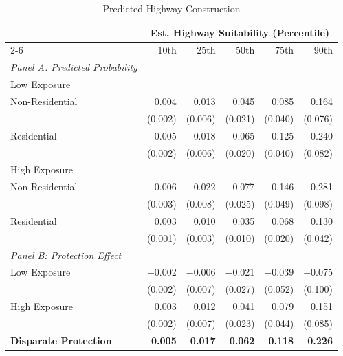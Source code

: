 \begin{table}[h]
\centering
\caption{Predicted Highway Construction }
\label{tab:predicted_outcomes/black_share_sweep}
\begin{threeparttable}
\begin{tabular*}{1\textwidth}{@{\extracolsep{\fill}}lr@{\hspace{1.2em}}r@{\hspace{1.2em}}r@{\hspace{1.2em}}r@{\hspace{1.2em}}r@{\hspace{1.2em}}}
\toprule
 & \multicolumn{5}{c}{Est. Highway Suitability (Percentile)} \\
\cmidrule(l){2-6}
 & 10th & 25th & 50th & 75th & 90th \\
\midrule
\textit{Panel A: Predicted Probability} & & & & & \\
\addlinespace[2pt]
Low Exposure & & & & & \\
\quad Non-Residential & 0.004 & 0.013 & 0.045 & 0.085 & 0.164 \\
 & (0.002) & (0.006) & (0.021) & (0.040) & (0.076) \\[4pt]
\quad Residential & 0.005 & 0.018 & 0.065 & 0.125 & 0.240 \\
 & (0.002) & (0.006) & (0.020) & (0.040) & (0.082) \\[4pt]
High Exposure & & & & & \\
\quad Non-Residential & 0.006 & 0.022 & 0.077 & 0.146 & 0.281 \\
 & (0.003) & (0.008) & (0.025) & (0.049) & (0.098) \\[4pt]
\quad Residential & 0.003 & 0.010 & 0.035 & 0.068 & 0.130 \\
 & (0.001) & (0.003) & (0.010) & (0.020) & (0.042) \\[4pt]
\midrule
\textit{Panel B: Protection Effect} & & & & & \\
\addlinespace[2pt]
Low Exposure & $-$0.002 & $-$0.006 & $-$0.021 & $-$0.039 & $-$0.075 \\
 & (0.002) & (0.007) & (0.027) & (0.052) & (0.100) \\[4pt]
High Exposure & 0.003 & 0.012\rlap{$^{*}$} & 0.041\rlap{$^{*}$} & 0.079\rlap{$^{*}$} & 0.151\rlap{$^{*}$} \\
 & (0.002) & (0.007) & (0.023) & (0.044) & (0.085) \\[4pt]
\addlinespace[2pt]
\textbf{Disparate Protection} & \textbf{0.005}\rlap{$^{***}$} & \textbf{0.017}\rlap{$^{***}$} & \textbf{0.062}\rlap{$^{***}$} & \textbf{0.118}\rlap{$^{***}$} & \textbf{0.226}\rlap{$^{***}$} \\

\end{tabular*}
\end{threeparttable}
\end{table}
